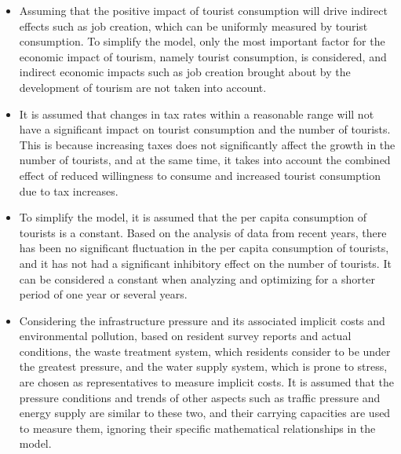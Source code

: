 \documentclass[12pt]{article}  %
\begin{document}
\begin{itemize}
	\item Assuming that the positive impact of tourist consumption will drive indirect effects such as job creation, which can be uniformly measured by tourist consumption. To simplify the model, only the most important factor for the economic impact of tourism, namely tourist consumption, is considered, and indirect economic impacts such as job creation brought about by the development of tourism are not taken into account.
	\item It is assumed that changes in tax rates within a reasonable range will not have a significant impact on tourist consumption and the number of tourists. This is because increasing taxes does not significantly affect the growth in the number of tourists, and at the same time, it takes into account the combined effect of reduced willingness to consume and increased tourist consumption due to tax increases.
	\item To simplify the model, it is assumed that the per capita consumption of tourists is a constant. Based on the analysis of data from recent years, there has been no significant fluctuation in the per capita consumption of tourists, and it has not had a significant inhibitory effect on the number of tourists. It can be considered a constant when analyzing and optimizing for a shorter period of one year or several years.
	\item Considering the infrastructure pressure and its associated implicit costs and environmental pollution, based on resident survey reports and actual conditions, the waste treatment system, which residents consider to be under the greatest pressure, and the water supply system, which is prone to stress, are chosen as representatives to measure implicit costs. It is assumed that the pressure conditions and trends of other aspects such as traffic pressure and energy supply are similar to these two, and their carrying capacities are used to measure them, ignoring their specific mathematical relationships in the model.

\end{itemize}
\end{document}
